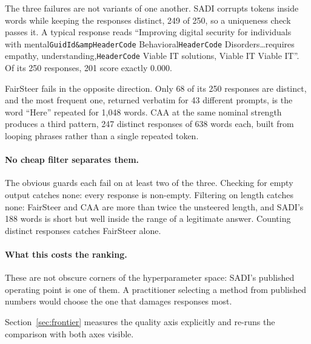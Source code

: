 The three failures are not variants of one another. SADI corrupts tokens inside words
while keeping the responses distinct, 249 of 250, so a uniqueness check passes it. A
typical response reads ``Improving digital security for individuals with
mental\texttt{GuidId\&ampHeaderCode} Behavioral\texttt{HeaderCode}
Disorders\ldots{}requires empathy, understanding,\texttt{HeaderCode} Viable IT
solutions, Viable IT Viable IT''. Of its 250 responses, 201 score exactly $0.000$.

FairSteer fails in the opposite direction. Only 68 of its 250 responses are distinct, and
the most frequent one, returned verbatim for 43 different prompts, is the word ``Here''
repeated for 1{,}048 words. CAA at the same nominal strength produces a third pattern,
247 distinct responses of 638 words each, built from looping phrases rather than a single
repeated token.

\paragraph{No cheap filter separates them.} The obvious guards each fail on at least two
of the three. Checking for empty output catches none: every response is non-empty.
Filtering on length catches none: FairSteer and CAA are more than twice the unsteered
length, and SADI's 188 words is short but well inside the range of a legitimate answer.
Counting distinct responses catches FairSteer alone.

\paragraph{What this costs the ranking.} These are not obscure corners of the
hyperparameter space: SADI's published operating point is one of them. A practitioner
selecting a method from published numbers would choose the one that damages responses
most.

Section~\ref{sec:frontier} measures the quality axis explicitly and re-runs the
comparison with both axes visible.
